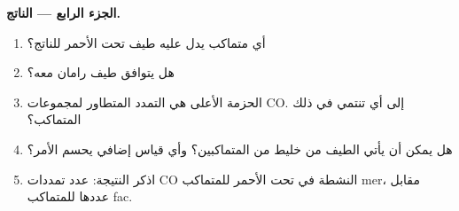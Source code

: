 \begin{problem}
\medskip\noindent\textbf{الجزء الرابع --- الناتج.}
\begin{enumerate}[resume]
  \item أي متماكب يدل عليه طيف تحت الأحمر للناتج؟
  \item هل يتوافق طيف رامان معه؟
  \item الحزمة الأعلى هي التمدد المتطاور لمجموعات CO. إلى أي
         تنتمي في ذلك المتماكب؟
  \item هل يمكن أن يأتي الطيف من خليط من المتماكبين؟ وأي
        قياس إضافي يحسم الأمر؟
  \item اذكر النتيجة: عدد تمددات CO النشطة في تحت الأحمر للمتماكب mer،
        مقابل عددها للمتماكب fac.
\end{enumerate}
\end{problem}
